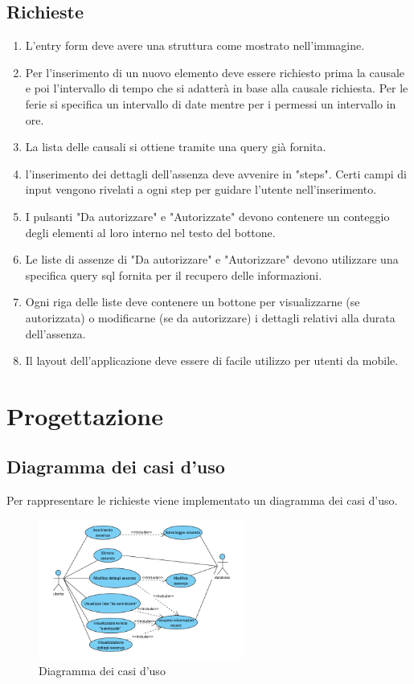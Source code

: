 \documentclass[target=bach,aauheader=,style=]{thud}
\begin{document}
\subsection{Richieste}
\begin{enumerate}
    \item L'entry form deve avere una struttura come mostrato nell'immagine.
    \item Per l'inserimento di un nuovo elemento deve essere richiesto prima la causale e poi l'intervallo di tempo che si adatterà in base alla causale richiesta.
    Per le ferie si specifica un intervallo di date mentre per i permessi un intervallo in ore.
    \item La lista delle causali si ottiene tramite una query già fornita.
    \item l'inserimento dei dettagli dell'assenza deve avvenire in "steps". Certi campi di input vengono rivelati a ogni step per guidare l'utente nell'inserimento.
    \item I pulsanti "Da autorizzare" e "Autorizzate" devono contenere un conteggio degli elementi al loro interno nel testo del bottone.
    \item Le liste di assenze di "Da autorizzare" e "Autorizzare" devono utilizzare una specifica query sql fornita per il recupero delle informazioni. 
    \item Ogni riga delle liste deve contenere un bottone per visualizzarne (se autorizzata) o modificarne (se da autorizzare) i dettagli relativi alla durata dell'assenza.
    \item Il layout dell'applicazione deve essere di facile utilizzo per utenti da mobile.
\end{enumerate}

\section{Progettazione}%

\subsection{Diagramma dei casi d'uso}
Per rappresentare le richieste viene implementato un diagramma dei casi d'uso.

\begin{figure}[H]
    \centering
    \includegraphics[width=0.6\textwidth]{diagrammi/caso d'uso finale.png}
    \caption{Diagramma dei casi d'uso}
\end{figure}
\end{document}
